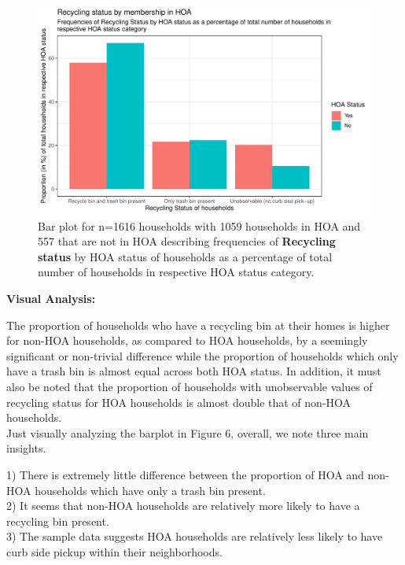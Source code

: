 \documentclass{article}
\begin{document}
\begin{figure}[H]
\centering
\includegraphics{part2-032}
\caption{Bar plot for n=1616 households with 1059 households in HOA and 557 that are not in HOA describing
frequencies of \textbf{Recycling status} by HOA status of households as a percentage of total number of households in respective HOA status category.} \label{Fig:Plot1}
\end{figure}

\textbf{Visual Analysis:} 

The proportion of households who have a recycling bin at their homes is higher for non-HOA households, as compared to HOA households, by a seemingly significant or non-trivial difference while the proportion of households which only have a trash bin is almost equal across both HOA status. In addition, it must also be noted that the proportion of households with unobservable values of recycling status for HOA households is almost double that of non-HOA households.\\

Just visually analyzing the barplot in Figure 6, overall, we note three main insights. 

1) There is extremely little difference between the proportion of HOA and non-HOA households which have only a trash bin present. \\

2) It seems that non-HOA households are relatively more likely to have a recycling bin present. \\

3) The sample data suggests HOA households are relatively less likely to have curb side pickup within their neighborhoods.\\
\end{document}
